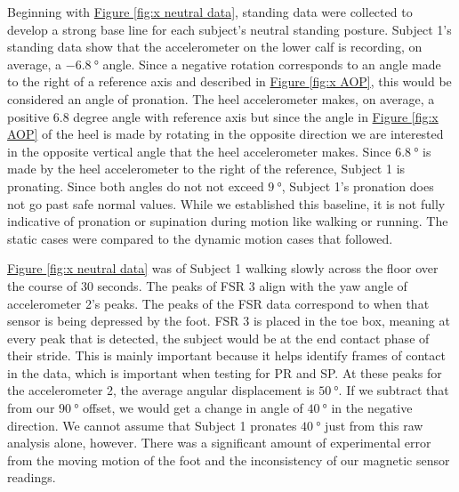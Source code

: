 Beginning with \hyperref[{fig:x neutral data}]{Figure \ref*{fig:x neutral data}}, standing data were collected to develop a strong base line for each subject's neutral standing posture.
Subject 1’s standing data show that the accelerometer on the lower calf is recording, on average, a $\SI{-6.8}{\degree}$ angle.
Since a negative rotation corresponds to an angle made to the right of a reference axis and described in \hyperref[{fig:x AOP}]{Figure \ref*{fig:x AOP}}, this would be considered an angle of pronation.
The heel accelerometer makes, on average, a positive 6.8 degree angle with reference axis but since the angle in \hyperref[{fig:x AOP}]{Figure \ref*{fig:x AOP}} of the heel is made by rotating in the opposite direction we are interested in the opposite vertical angle that the heel accelerometer makes.
Since $\SI{6.8}{\degree}$ is made by the heel accelerometer to the right of the reference, Subject 1 is pronating.
Since both angles do not not exceed $\SI{9}{\degree}$, Subject 1’s pronation does not go past safe normal values.
While we established this baseline, it is not fully indicative of pronation or supination during motion like walking or running.
The static cases were compared to the dynamic motion cases that followed.\par

\hyperref[{fig:x neutral data}]{Figure \ref*{fig:x neutral data}} was of Subject 1 walking slowly across the floor over the course of 30 seconds.
The peaks of FSR 3 align with the yaw angle of accelerometer 2’s peaks.
The peaks of the FSR data correspond to when that sensor is being depressed by the foot.
FSR 3 is placed in the toe box, meaning at every peak that is detected, the subject would be at the end contact phase of their stride.
This is mainly important because it helps identify frames of contact in the data, which is important when testing for PR and SP.
At these peaks for the accelerometer 2, the average angular displacement is $\SI{50}{\degree}$.
If we subtract that from our $\SI{90}{\degree}$ offset, we would get a change in angle of $\SI{40}{\degree}$ in the negative direction.
We cannot assume that Subject 1 pronates $\SI{40}{\degree}$ just from this raw analysis alone, however.
There was a significant amount of experimental error from the moving motion of the foot and the inconsistency of our magnetic sensor readings.\par

